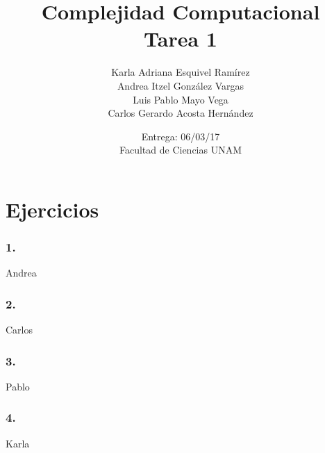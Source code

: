 \documentclass[12pt]{article}
\title{Complejidad Computacional \\ Tarea 1}
\author{Karla Adriana Esquivel Ramírez \\ Andrea Itzel González Vargas\\ Luis Pablo Mayo Vega \\ Carlos Gerardo Acosta Hernández}
\date{Entrega: 06/03/17 \\ Facultad de Ciencias UNAM}
\begin{document}
\maketitle
\section*{Ejercicios}
\subsubsection*{1.}
Andrea
\subsubsection*{2.}
Carlos
\subsubsection*{3.}
Pablo
\subsubsection*{4.}
Karla
\end{document}
